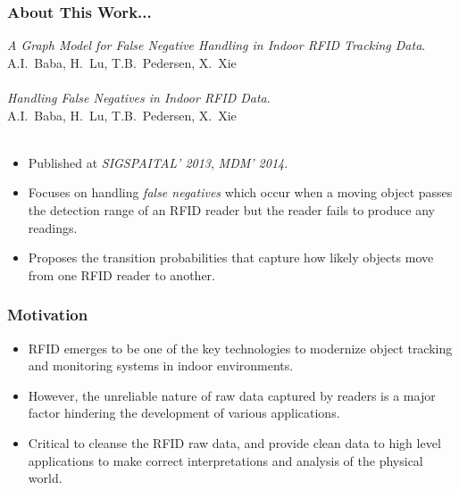 \begin{frame}
\frametitle{About This Work...}

\emph{A Graph Model for False Negative Handling in Indoor RFID Tracking Data}.~\cite{baba2013graph}\\
A.I.~Baba, H.~Lu, T.B.~Pedersen, X.~Xie\\~\\

\emph{Handling False Negatives in Indoor RFID Data}.~\cite{baba2014handling} \\
A.I.~Baba, H.~Lu, T.B.~Pedersen, X.~Xie\\~\\

\begin{itemize}
  \item Published at \emph{SIGSPAITAL' 2013}, \emph{MDM' 2014}.
  \item Focuses on handling \emph{false negatives} which occur when a moving object passes the detection range of an RFID reader but the reader fails to produce any readings.
  \item Proposes the transition probabilities that capture how likely objects move from one RFID reader to another.
\end{itemize}

\end{frame}


\begin{frame}
\frametitle{Motivation}

\begin{itemize}
  \item RFID emerges to be one of the key technologies to modernize object tracking and monitoring systems in indoor environments.
  \item However, the unreliable nature of raw data captured by readers is a major factor hindering the development of various applications.
  \item Critical to cleanse the RFID raw data, and provide clean data to high level applications to make correct interpretations and analysis of the physical world.
\end{itemize}

\end{frame}

